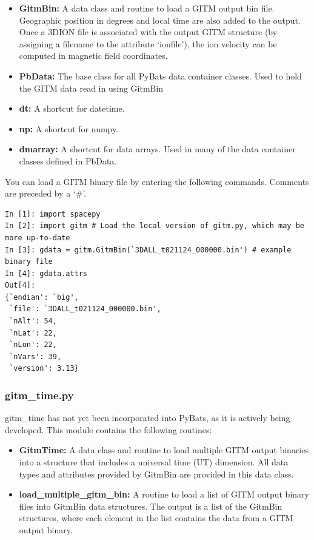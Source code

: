 \begin{itemize}
\item[]{\bf GitmBin: } A data class and routine to load a GITM output bin file.  Geographic position in degrees and local time are also added to the output.  Once a 3DION file is associated with the output GITM structure (by assigning a filename to the attribute `ionfile'), the ion velocity can be computed in magnetic field coordinates.
\item[]{\bf PbData: } The base class for all PyBats data container classes.  Used to hold the GITM data read in using GitmBin
\item[]{\bf dt: } A shortcut for datetime.
\item[]{\bf np: } A shortcut for numpy.
\item[]{\bf dmarray: } A shortcut for data arrays.  Used in many of the data container classes defined in PbData.
\end{itemize}

You can load a GITM binary file by entering the following commands.  Comments are preceded by a `\#'.

\begin{verbatim}
In [1]: import spacepy
In [2]: import gitm # Load the local version of gitm.py, which may be more up-to-date
In [3]: gdata = gitm.GitmBin(`3DALL_t021124_000000.bin') # example binary file
In [4]: gdata.attrs
Out[4]:
{`endian': `big',
 `file': `3DALL_t021124_000000.bin',
 `nAlt': 54,
 `nLat': 22,
 `nLon': 22,
 `nVars': 39,
 `version': 3.13}
\end{verbatim}

\subsubsection{gitm\_time.py}

gitm\_time has not yet been incorporated into PyBats, as it is actively being developed.   This module contains the following routines:

\begin{itemize}
\item[]{\bf GitmTime: } A data class and routine to load multiple GITM output binaries into a structure that includes a universal time (UT) dimension.  All data types and attributes provided by GitmBin are provided in this data class.
\item[]{\bf load\_multiple\_gitm\_bin: } A routine to load a list of GITM output binary files into GitmBin data structures.  The output is a list of the GitmBin structures, where each element in the list contains the data from a GITM output binary.
\end{itemize}


